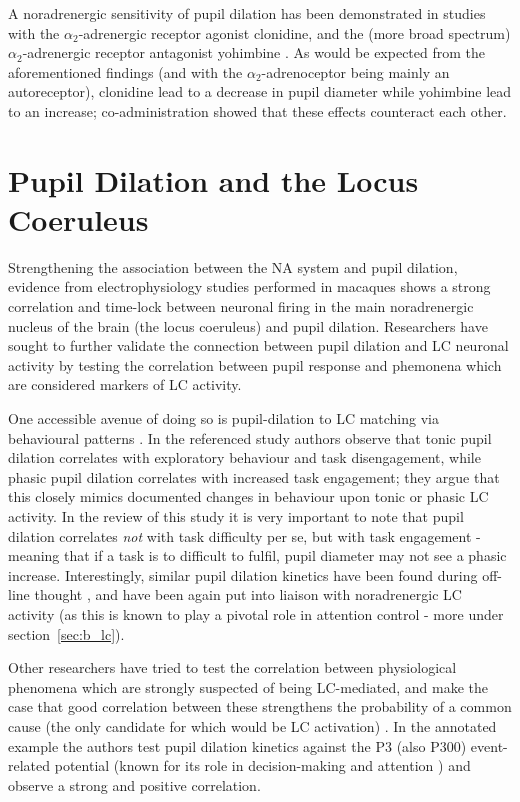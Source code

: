	A noradrenergic sensitivity of pupil dilation has been demonstrated in studies with the $\alpha_2$-adrenergic receptor agonist clonidine, and the (more broad spectrum) $\alpha_2$-adrenergic receptor antagonist yohimbine \citep{Phillips2000}. 
	As would be expected from the aforementioned findings (and with the $\alpha_2$-adrenoceptor being mainly an autoreceptor), clonidine lead to a decrease in pupil diameter while yohimbine lead to an increase; co-administration showed that these effects counteract each other.
	
    \section{Pupil Dilation and the Locus Coeruleus}
	Strengthening the association between the NA system and pupil dilation, evidence from electrophysiology studies performed in macaques \citep{Rajkowski1994} shows a strong correlation and time-lock between neuronal firing in the main noradrenergic nucleus of the brain (the locus coeruleus) and pupil dilation.
	Researchers have sought to further validate the connection between pupil dilation and LC neuronal activity by testing the correlation between pupil response and phemonena which are considered markers of LC activity.
	
	One accessible avenue of doing so is pupil-dilation to LC matching via behavioural patterns \citep{Gilzenrat2010}.
	In the referenced study authors observe that tonic pupil dilation correlates with exploratory behaviour and task disengagement, while phasic pupil dilation correlates with increased task engagement; they argue that this closely mimics documented \citep{Aston-Jones2005} changes in behaviour upon tonic or phasic LC activity.
	In the review of this study it is very important to note that pupil dilation correlates \textit{not} with task difficulty per se, but with task engagement - meaning that if a task is to difficult to fulfil, pupil diameter may not see a phasic increase.
	Interestingly, similar pupil dilation kinetics have been found during off-line thought \citep{Smallwood2011}, and have been again put into liaison with noradrenergic LC activity (as this is known to play a pivotal role in attention control - more under section~\ref{sec:b_lc}).   
	
	Other researchers have tried to test the correlation between physiological phenomena which are strongly suspected of being LC-mediated, and make the case that good correlation between these strengthens the probability of a common cause (the only candidate for which would be LC activation) \citep{Murphy2011}.
	In the annotated example the authors test pupil dilation kinetics against the P3 (also P300) event-related potential (known for its role in decision-making \citep{CHAPMAN1964} and attention \citep{Picton1992}) and observe a strong and positive correlation.
	
